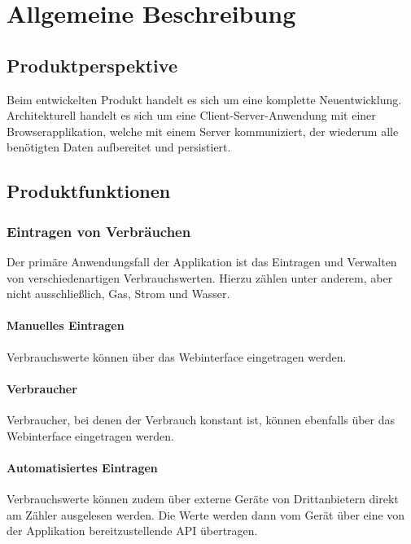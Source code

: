 \section{Allgemeine Beschreibung}\label{sec:allgemeine-beschreibung}

\subsection{Produktperspektive}\label{subsec:produktperspektive}


Beim entwickelten Produkt handelt es sich um eine komplette Neuentwicklung.
Architekturell handelt es sich um eine Client-Server-Anwendung mit einer Browserapplikation,
welche mit einem Server kommuniziert, der wiederum alle benötigten Daten aufbereitet und persistiert.

\subsection{Produktfunktionen}\label{subsec:produktfunktionen}

\subsubsection{Eintragen von Verbräuchen}

Der primäre Anwendungsfall der Applikation ist das Eintragen und Verwalten von verschiedenartigen Verbrauchswerten.
Hierzu zählen unter anderem, aber nicht ausschließlich, Gas, Strom und Wasser.

\paragraph{Manuelles Eintragen}

Verbrauchswerte können über das Webinterface eingetragen werden.

\paragraph{Verbraucher}
Verbraucher, bei denen der Verbrauch konstant ist, können ebenfalls über das Webinterface eingetragen werden.

\paragraph{Automatisiertes Eintragen}
\label{par:autom_eintragen}

Verbrauchswerte können zudem über externe Geräte von Drittanbietern direkt am Zähler ausgelesen werden.
Die Werte werden dann vom Gerät über eine von der Applikation bereitzustellende API übertragen.

